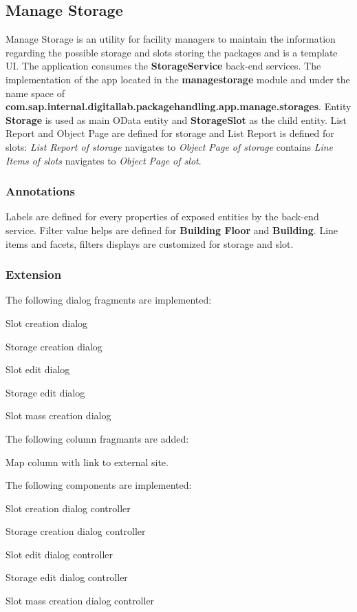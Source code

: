 \subsection{Manage Storage}

Manage Storage is an utility for facility managers to maintain the information regarding the possible storage and slots storing the packages and is a template UI.
The application consumes the \textbf{StorageService} back-end services.
The implementation of the app
located in the \textbf{managestorage} module and under the name space of
\textbf{com.sap.internal.digitallab.packagehandling.app.manage.storages}.
Entity \textbf{Storage} is used as main OData entity and \textbf{StorageSlot} as the child entity.
List Report and Object Page are defined for storage and List Report is defined for slots: \textit{List Report of storage} navigates to \textit{Object Page of storage} contains \textit{Line Items of 
slots} navigates to \textit{Object Page of slot}.

\subsubsection{Annotations}
Labels are defined for every properties of exposed entities by the back-end service. Filter value helps are defined for \textbf{Building Floor} and \textbf{Building}.
Line items and facets, filters displays are customized for storage and slot.

\subsubsection{Extension}

The following dialog fragments are implemented:
\begin{compactenum}
    \item Slot creation dialog
    \item Storage creation dialog
    \item Slot edit dialog
    \item Storage edit dialog
    \item Slot mass creation dialog
\end{compactenum}

\bigskip
The following column fragmants are added:
\begin{compactenum}
    \item Map column with link to external site.
\end{compactenum}

\bigskip
The following components are implemented:
\begin{compactenum}
    \item Slot creation dialog controller
    \item Storage creation dialog controller
    \item Slot edit dialog controller
    \item Storage edit dialog controller
    \item Slot mass creation dialog controller
\end{compactenum}


